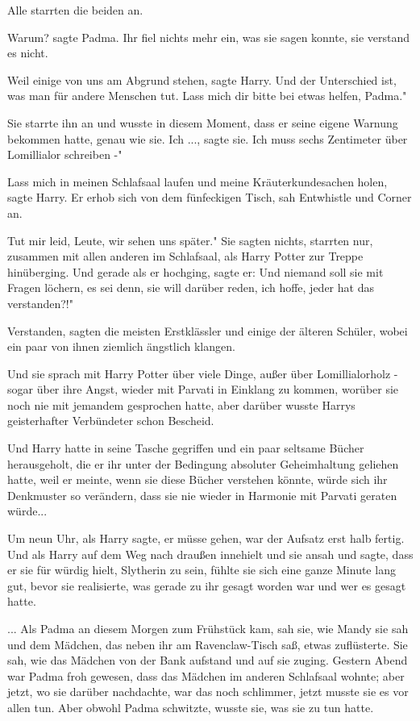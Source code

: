 Alle starrten die beiden an.

\glqq Warum?\grqq{} sagte Padma. Ihr fiel nichts mehr ein, was sie sagen konnte,
sie verstand es nicht.

\glqq Weil einige von uns am Abgrund stehen\grqq{}, sagte Harry. \glqq Und der
Unterschied ist, was man für andere Menschen tut. Lass mich dir bitte bei etwas
helfen, Padma."

Sie starrte ihn an und wusste in diesem Moment, dass er seine eigene Warnung
bekommen hatte, genau wie sie. \glqq Ich ...\grqq{}, sagte sie. \glqq Ich muss
sechs Zentimeter über Lomillialor schreiben -"

\glqq Lass mich in meinen Schlafsaal laufen und meine Kräuterkundesachen
holen\grqq{}, sagte Harry. Er erhob sich von dem fünfeckigen Tisch, sah
Entwhistle und Corner an.

\glqq Tut mir leid, Leute, wir sehen uns später." Sie sagten nichts, starrten
nur, zusammen mit allen anderen im Schlafsaal, als Harry Potter zur Treppe
hinüberging. Und gerade als er hochging, sagte er: \glqq Und niemand soll sie
mit Fragen löchern, es sei denn, sie will darüber reden, ich hoffe, jeder hat
das verstanden?!"

\glqq Verstanden\grqq{}, sagten die meisten Erstklässler und einige der älteren
Schüler, wobei ein paar von ihnen ziemlich ängstlich klangen.

Und sie sprach mit Harry Potter über viele Dinge, außer über Lomillialorholz -
sogar über ihre Angst, wieder mit Parvati in Einklang zu kommen, worüber sie
noch nie mit jemandem gesprochen hatte, aber darüber wusste Harrys geisterhafter
Verbündeter schon Bescheid.

Und Harry hatte in seine Tasche gegriffen und ein paar seltsame Bücher
herausgeholt, die er ihr unter der Bedingung absoluter Geheimhaltung geliehen
hatte, weil er meinte, wenn sie diese Bücher verstehen könnte, würde sich ihr
Denkmuster so verändern, dass sie nie wieder in Harmonie mit Parvati geraten
würde...

Um neun Uhr, als Harry sagte, er müsse gehen, war der Aufsatz erst halb fertig.
Und als Harry auf dem Weg nach draußen innehielt und sie ansah und sagte, dass
er sie für würdig hielt, Slytherin zu sein, fühlte sie sich eine ganze Minute
lang gut, bevor sie realisierte, was gerade zu ihr gesagt worden war und wer es
gesagt hatte.

... Als Padma an diesem Morgen zum Frühstück kam, sah sie, wie Mandy sie sah und
dem Mädchen, das neben ihr am Ravenclaw-Tisch saß, etwas zuflüsterte. Sie sah,
wie das Mädchen von der Bank aufstand und auf sie zuging. Gestern Abend war
Padma froh gewesen, dass das Mädchen im anderen Schlafsaal wohnte; aber jetzt,
wo sie darüber nachdachte, war das noch schlimmer, jetzt musste sie es vor allen
tun. Aber obwohl Padma schwitzte, wusste sie, was sie zu tun hatte.

